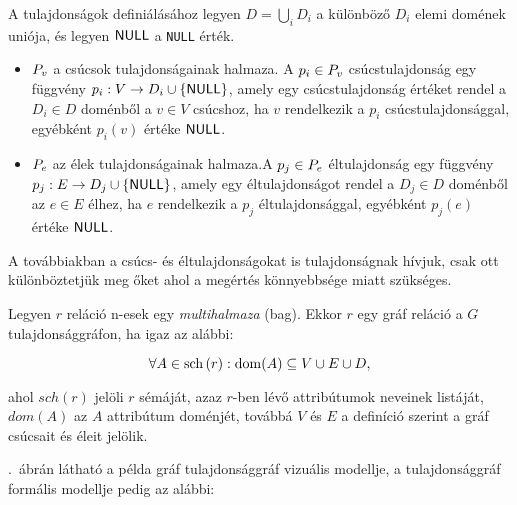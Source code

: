 A tulajdonságok definiálásához legyen $D = \bigcup_i D_i$ a különböző $D_i$ elemi domének uniója, és legyen $\mathsf{NULL}$ a \texttt{NULL} érték.
\begin{itemize}
	\item $P_v$ a csúcsok tulajdonságainak halmaza. A $p_i \in P_v$ csúcstulajdonság egy függvény $p_i: V \rightarrow D_i \cup \{ \mathsf{NULL} \}$, amely egy csúcstulajdonság értéket rendel a $D_i \in D$ doménből a $v \in V$ csúcshoz, ha $v$ rendelkezik a $p_i$ csúcstulajdonsággal, egyébként $p_i(v)$ értéke $\mathsf{NULL}$.
	\item $P_e$ az élek tulajdonságainak halmaza.A $p_j \in P_e$ éltulajdonság egy függvény $p_j: E \rightarrow D_j \cup \{ \mathsf{NULL} \}$, amely egy éltulajdonságot rendel a $D_j \in D$ doménből az $e \in E$ élhez, ha $e$ rendelkezik a $p_j$ éltulajdonsággal, egyébként $p_j(e)$ értéke $\mathsf{NULL}$.
\end{itemize}
A továbbiakban a csúcs- és éltulajdonságokat is tulajdonságnak hívjuk, csak ott különböztetjük meg őket ahol a megértés könnyebbsége miatt szükséges. 

Legyen $r$ reláció n-esek egy \emph{multihalmaza} (bag). Ekkor $r$ egy gráf reláció a $G$ tulajdonsággráfon, ha igaz az alábbi:

$$\forall A \in \mathrm{sch} \left( r \right): \mathrm{dom}(A) \subseteq V \cup E \cup D,$$

ahol $sch(r)$ jelöli $r$ sémáját, azaz $r$-ben lévő attribútumok neveinek listáját, $dom(A)$ az $A$ attribútum doménjét, továbbá $V$ és $E$ a definíció szerint a gráf csúcsait és éleit jelölik. 

.~ábrán látható a példa gráf tulajdonsággráf vizuális modellje, a tulajdonsággráf formális modellje pedig az alábbi:

